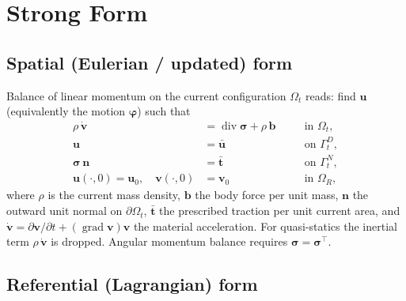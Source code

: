 \documentclass[11pt]{article}
\newcommand{\dive}{\operatorname{div}}      %
\newcommand{\grad}{\operatorname{grad}}     %
\newcommand{\bu}{\bm{u}}
\newcommand{\bv}{\bm{v}}
\newcommand{\bb}{\bm{b}}
\newcommand{\bn}{\bm{n}}
\newcommand{\bt}{\bm{t}}
\newcommand{\bsig}{\bm{\sigma}}
\newcommand{\bphi}{\bm{\varphi}}
\begin{document}
\section{Strong Form}

\subsection{Spatial (Eulerian / updated) form}

Balance of linear momentum on the current configuration $\Omega_t$ reads:
find $\bu$ (equivalently the motion $\bphi$) such that
\begin{subequations}
\label{eq:strong-spatial}
\begin{alignat}{2}
  \rho\,\dot{\bv} &= \dive \bsig + \rho\, \bb
      &\quad& \text{in } \Omega_t, \label{eq:mom-spatial}\\
  \bu &= \bar{\bu} && \text{on } \Gamma_t^D, \\
  \bsig\,\bn &= \bar{\bt} && \text{on } \Gamma_t^N, \\
  \bu(\cdot,0) = \bu_0, \quad \bv(\cdot,0) &= \bv_0 && \text{in } \Omega_R,
\end{alignat}
\end{subequations}
where $\rho$ is the current mass density, $\bb$ the body force per unit mass,
$\bn$ the outward unit normal on $\partial\Omega_t$, $\bar{\bt}$ the
prescribed traction per unit current area, and
$\dot{\bv} = \partial\bv/\partial t + (\grad\bv)\bv$ the material
acceleration.  For quasi-statics the inertial term $\rho\,\dot{\bv}$ is
dropped.  Angular momentum balance requires $\bsig = \bsig^{\top}$.

\subsection{Referential (Lagrangian) form}
\end{document}
